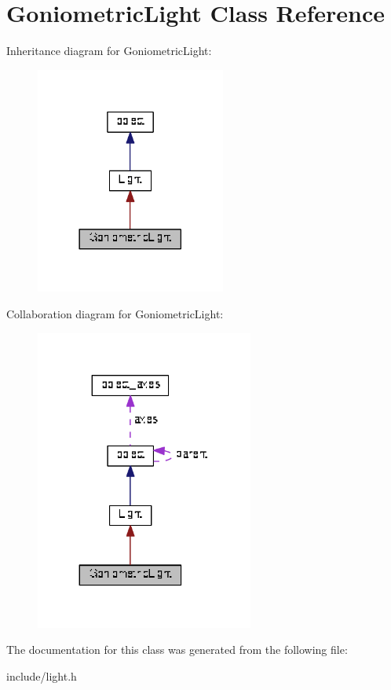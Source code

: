 \hypertarget{classGoniometricLight}{}\section{Goniometric\+Light Class Reference}
\label{classGoniometricLight}


Inheritance diagram for Goniometric\+Light\+:\nopagebreak
\begin{figure}[H]
\begin{center}
\leavevmode
\includegraphics[width=177pt]{classGoniometricLight__inherit__graph}
\end{center}
\end{figure}


Collaboration diagram for Goniometric\+Light\+:\nopagebreak
\begin{figure}[H]
\begin{center}
\leavevmode
\includegraphics[width=203pt]{classGoniometricLight__coll__graph}
\end{center}
\end{figure}


The documentation for this class was generated from the following file\+:\begin{DoxyCompactItemize}
\item 
include/light.\+h\end{DoxyCompactItemize}
